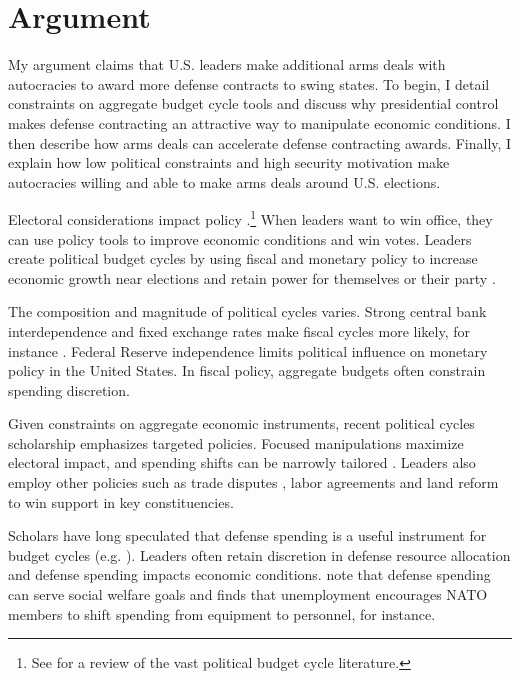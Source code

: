 \documentclass[12pt]{article}
\begin{document}
\section{Argument}


My argument claims that U.S. leaders make additional arms deals with autocracies to award more defense contracts to swing states.
To begin, I detail constraints on aggregate budget cycle tools and discuss why presidential control makes defense contracting an attractive way to manipulate economic conditions.
I then describe how arms deals can accelerate defense contracting awards. 
Finally, I explain how low political constraints and high security motivation make autocracies willing and able to make arms deals around U.S. elections.


Electoral considerations impact policy \citep{Nordhaus1975}.\footnote{See \citet{Dubois2016} for a review of the vast political budget cycle literature.} 
When leaders want to win office, they can use policy tools to improve economic conditions and win votes. 
Leaders create political budget cycles by using fiscal and monetary policy to increase economic growth near elections and retain power for themselves or their party \citep{Tufte1978, Rogoff1987}. 


The composition and magnitude of political cycles varies. 
Strong central bank interdependence and fixed exchange rates make fiscal cycles more likely, for instance \citep{ClarkHallerberg2000}. 
Federal Reserve independence limits political influence on monetary policy in the United States. 
In fiscal policy, aggregate budgets often constrain spending discretion.


Given constraints on aggregate economic instruments, recent political cycles scholarship emphasizes targeted policies.
Focused manipulations maximize electoral impact, and spending shifts can be narrowly tailored \citep[pg. 248]{Dubois2016}.
Leaders also employ other policies such as trade disputes \citep{Conconietal2017}, labor agreements \citep{Ahlquist2010} and land reform \citep{Philips2020} to win support in key constituencies.


Scholars have long speculated that defense spending is a useful instrument for budget cycles (e.g. \cite{Tufte1978, Mintz1988}).
Leaders often retain discretion in defense resource allocation and defense spending impacts economic conditions.
\citet{WhittenWilliams2011} note that defense spending can serve social welfare goals and \citet{Becker2021} finds that unemployment encourages NATO members to shift spending from equipment to personnel, for instance.
\end{document}
